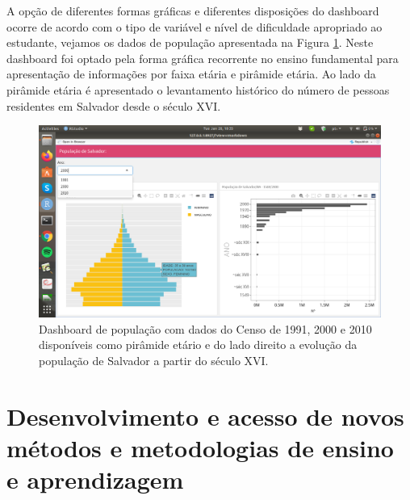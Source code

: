 \documentclass[
]{book}
\begin{document}
A opção de diferentes formas gráficas e diferentes disposições do dashboard ocorre de acordo com o tipo de variável e nível de dificuldade apropriado ao estudante, vejamos os dados de população apresentada na Figura \ref{fig:dashm5cossa}. Neste dashboard foi optado pela forma gráfica recorrente no ensino fundamental para apresentação de informações por faixa etária e pirâmide etária. Ao lado da pirâmide etária é apresentado o levantamento histórico do número de pessoas residentes em Salvador desde o século XVI.

\begin{figure}
\includegraphics[width=18.97in]{images/image51} \caption{Dashboard de população com dados do Censo de 1991, 2000 e 2010 disponíveis como pirâmide etário e do lado direito a evolução da população de Salvador a partir do século XVI.}\label{fig:dashm5cossa}
\end{figure}

\hypertarget{desenvolvimento-e-acesso-de-novos-muxe9todos-e-metodologias-de-ensino-e-aprendizagem}{%
\chapter{Desenvolvimento e acesso de novos métodos e metodologias de ensino e aprendizagem}\label{desenvolvimento-e-acesso-de-novos-muxe9todos-e-metodologias-de-ensino-e-aprendizagem}}
\end{document}
